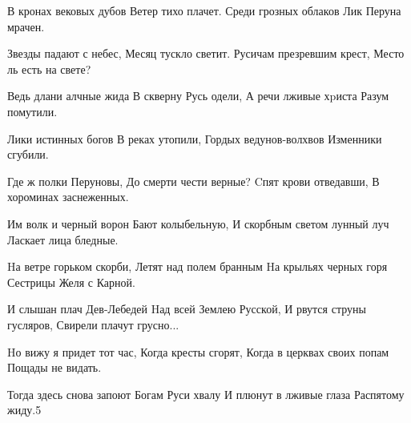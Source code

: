 \documentclass[../MAIN.tex]{subfiles}
\begin{document}
В кронах вековых дубов
Ветер тихо плачет.
Среди грозных облаков
Лик Перуна мрачен.

Звезды падают с небес,
Месяц тускло светит.
Русичам презревшим крест,
Место ль есть на свете?

Ведь длани алчные жида
В скверну Русь одели,
А речи лживые хpиста
Разум помутили.

Лики истинных богов
В реках утопили,
Гордых ведунов-волхвов
Изменники сгубили.

Где ж полки Перуновы,
До смерти чести верные?
Cпят крови отведавши,
В хороминах заснеженных.

Им волк и черный ворон
Бают колыбельную,
И скорбным светом лунный луч
Ласкает лица бледные.

Hа ветре горьком скорби,
Летят над полем бранным
Hа крыльях черных горя
Сестрицы Желя с Карной.

И слышан плач Дев-Лебедей
Hад всей Землею Русской,
И рвутся струны гусляров,
Свирели плачут грусно...

Hо вижу я придет тот час,
Когда кресты сгорят,
Когда в церквах своих попам
Пощады не видать.

Тогда здесь снова запоют
Богам Руси хвалу
И плюнут в лживые глаза
Распятому жиду.5
\end{document}

